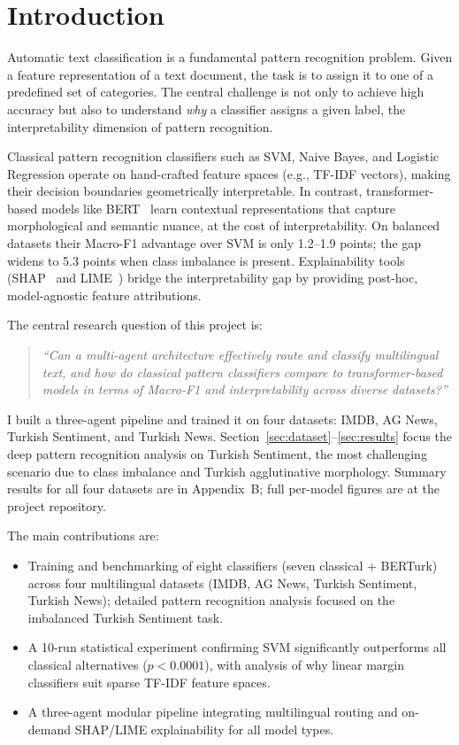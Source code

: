 \documentclass[conference]{IEEEtran}
\begin{document}
\section{Introduction}
\label{sec:introduction}

Automatic text classification is a fundamental pattern recognition problem. Given a
feature representation of a text document, the task is to assign it to one of a
predefined set of categories. The central challenge is not only to achieve high accuracy
but also to understand \textit{why} a classifier assigns a given label, the
interpretability dimension of pattern recognition.

Classical pattern recognition classifiers such as SVM, Naive Bayes, and Logistic
Regression operate on hand-crafted feature spaces (e.g., TF-IDF vectors), making their
decision boundaries geometrically interpretable. In contrast, transformer-based models
like BERT~\cite{b2} learn contextual representations that capture morphological and
semantic nuance, at the cost of interpretability. On balanced datasets their Macro-F1
advantage over SVM is only 1.2--1.9 points; the gap widens to 5.3 points when class
imbalance is present. Explainability tools (SHAP~\cite{b4} and LIME~\cite{b5})
bridge the interpretability gap by providing post-hoc, model-agnostic feature attributions.

The central research question of this project is:
\begin{quote}
\textit{``Can a multi-agent architecture effectively route and classify multilingual
text, and how do classical pattern classifiers compare to transformer-based models in
terms of Macro-F1 and interpretability across diverse datasets?''}
\end{quote}

I built a three-agent pipeline and trained it on four datasets: IMDB, AG News, Turkish
Sentiment, and Turkish News. Section~\ref{sec:dataset}--\ref{sec:results} focus the
deep pattern recognition analysis on Turkish Sentiment, the most challenging scenario
due to class imbalance and Turkish agglutinative morphology. Summary results for all
four datasets are in Appendix~B; full per-model figures are at the project repository.

The main contributions are:
\begin{itemize}
	\item Training and benchmarking of eight classifiers (seven classical + BERTurk)
	      across four multilingual datasets (IMDB, AG News, Turkish Sentiment, Turkish
	      News); detailed pattern recognition analysis focused on the imbalanced
	      Turkish Sentiment task.
	\item A 10-run statistical experiment confirming SVM significantly outperforms
	      all classical alternatives ($p < 0.0001$), with analysis of why linear
	      margin classifiers suit sparse TF-IDF feature spaces.
	\item A three-agent modular pipeline integrating multilingual routing and
	      on-demand SHAP/LIME explainability for all model types.
\end{itemize}
\end{document}
